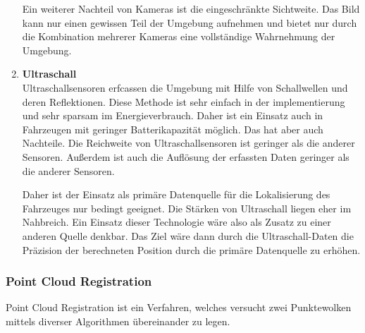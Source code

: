 \begin{enumerate}[leftmargin=*]
    Ein weiterer Nachteil von Kameras ist die eingeschränkte Sichtweite. 
    Das Bild kann nur einen gewissen Teil der Umgebung aufnehmen und bietet nur durch die Kombination mehrerer Kameras eine vollständige Wahrnehmung der Umgebung.


    \item \textbf{Ultraschall} \\
    Ultraschallsensoren erfcassen die Umgebung mit Hilfe von Schallwellen und deren Reflektionen. 
    Diese Methode ist sehr einfach in der implementierung und sehr sparsam im Energieverbrauch. 
    Daher ist ein Einsatz auch in Fahrzeugen mit geringer Batterikapazität möglich.
    Das hat aber auch Nachteile. 
    Die Reichweite von Ultraschallsensoren ist geringer als die anderer Sensoren. 
    Außerdem ist auch die Auflösung der erfassten Daten geringer als die anderer Sensoren.

    Daher ist der Einsatz als primäre Datenquelle für die Lokalisierung des Fahrzeuges nur bedingt geeignet.
    Die Stärken von Ultraschall liegen eher im Nahbreich.
    Ein Einsatz dieser Technologie wäre also als Zusatz zu einer anderen Quelle denkbar. 
    Das Ziel wäre dann durch die Ultraschall-Daten die Präzision der berechneten Position durch die primäre Datenquelle zu erhöhen. 
\end{enumerate}

\subsubsection{Point Cloud Registration}
Point Cloud Registration ist ein Verfahren, welches versucht zwei Punktewolken mittels diverser Algorithmen übereinander zu legen.

\newpage
